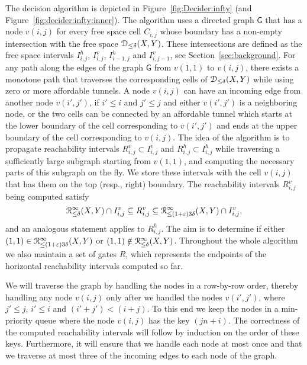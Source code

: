\documentclass[12pt]{article}
\newcommand{\secref}[1]{Section~\ref{sec:#1}}
\newcommand{\figref}[1]{Figure~\ref{fig:#1}}
\newcommand{\eqlab}[1]{\label{equation:#1}}
\newcommand{\Reached}{R}
\newcommand{\SimplifyX}[1]{#1}
\newcommand{\cXBase}{X} \newcommand{\cYBase}{Y} \newcommand{\crvCBase}{{\pi}}
\newcommand{\cX}{\SimplifyX{\cXBase}}
\newcommand{\cY}{\SimplifyX{\cYBase}}
\newcommand{\FDleqI}[2]{\ensuremath{\EuScript{R}^{#1}_{\leq #2}}}
\newcommand{\FullFDleqC}{\EuScript{D}}
\newcommand{\FullFDleq}[1]{\FullFDleqC_{\leq #1}}
\newcommand{\Graph}{\mathsf{G}}
\providecommand{\pth}[2][\!]{#1\left({#2}\right)}
\newcommand{\CellXY}[2]{C_{#1,#2}}
\newcommand{\IVCellXY}[2]{I^v_{#1,#2}}
\newcommand{\IHCellXY}[2]{I^h_{#1,#2}}
\newcommand{\RVCellXY}[2]{R^v_{#1,#2}}
\newcommand{\RHCellXY}[2]{R^h_{#1,#2}}
\providecommand{\eps}{{\varepsilon}}\renewcommand{\Re}{{\rm I\!\hspace{-0.025em} R}}
\numberwithin{figure}{section}
\numberwithin{equation}{section}
\begin{document}
The decision algorithm is depicted in \figref{Decider:infty} (and
\figref{decider:infty:inner}).  The algorithm uses a directed graph
$\Graph$ that has a node $v(i,j)$ for every free space cell
$\CellXY{i}{j}$ whose boundary has a non-empty intersection with the
free space $\FullFDleq{\delta}(\cX,\cY)$.  These intersections are
defined as the free space intervals $\IHCellXY{i}{j}$,
$\IVCellXY{i}{j}$, $\IHCellXY{i-1}{j}$ and $\IVCellXY{i}{j-1}$, see
\secref{background}.  For any path along the edges of the graph
$\Graph$ from $v(1,1)$ to $v(i,j)$, there exists a monotone path that
traverses the corresponding cells of $\FullFDleq{\delta}(\cX,\cY)$
while using zero or more affordable tunnels.  A node $v(i,j)$ can have
an incoming edge from another node $v(i',j')$, if $i'\leq i$ and $j'
\leq j$ and either $v(i',j')$ is a neighboring node, or the two cells
can be connected by an affordable tunnel which starts at the lower
boundary of the cell corresponding to $v(i',j')$ and ends at the upper
boundary of the cell corresponding to $v(i,j)$.  The idea of the
algorithm is to propagate reachability intervals $\RVCellXY{i}{j}
\subset \IVCellXY{i}{j}$ and $\RHCellXY{i}{j} \subset \IHCellXY{i}{j}$
while traversing a sufficiently large subgraph starting from $v(1,1)$,
and computing the necessary parts of this subgraph on the fly.  We
store these intervals with the cell $v(i,j)$ that has them on the top
(resp., right) boundary.  The reachability intervals $\RVCellXY{i}{j}$
being computed satisfy
\begin{equation}
    \FDleqI{\infty}{\delta}\pth{\cX,\cY} \cap \IVCellXY{i}{j}\subseteq \RVCellXY{i}{j}\subseteq \FDleqI{\infty}{(1+\eps)3\delta}\pth{\cX,\cY} \cap
    \IVCellXY{i}{j},
\eqlab{reachable:good}
\end{equation}
and an analogous statement applies to $\RHCellXY{i}{j}$.  The aim is
to determine if either $(1,1) \in
\FDleqI{\infty}{(1+\eps)3\delta}\pth{\cX,\cY}$ or $(1,1) \notin
\FDleqI{\infty}{\delta}\pth{\cX,\cY}$.  Throughout the whole algorithm
we also maintain a set of gates $\Reached$, which represents the
endpoints of the horizontal reachability intervals computed so far.

We will traverse the graph by handling the nodes in a row-by-row
order, thereby handling any node $v(i,j)$ only after we handled the
nodes $v(i',j')$, where $j'\leq j$, $i'\leq i$ and $(i'+j')<(i+j)$.
To this end we keep the nodes in a min-priority queue where the node
$v(i,j)$ has the key $(jn+i)$.  The correctness of the computed
reachability intervals will follow by induction on the order of these
keys.  Furthermore, it will ensure that we handle each node at most
once and that we traverse at most three of the incoming edges to each
node of the graph.
\end{document}
